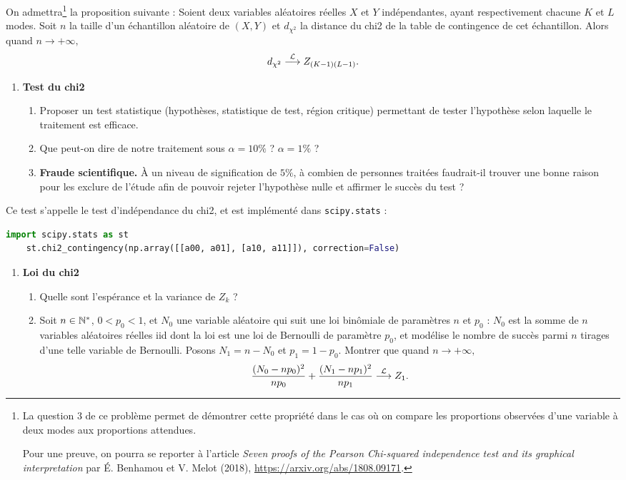 \documentclass[french,11pt]{article}
\begin{document}
On admettra\footnote{La question 3 de ce problème permet de démontrer
cette propriété dans le cas où on compare les proportions observées d'une
variable à deux modes aux proportions attendues.

Pour une preuve, on pourra se reporter à l'article \textit{Seven proofs of the
  Pearson Chi-squared independence test and its graphical interpretation} par
É. Benhamou et V. Melot (2018),
\href{https://arxiv.org/abs/1808.09171}{https://arxiv.org/abs/1808.09171}.  }
la proposition suivante : Soient deux variables aléatoires réelles $X$ et $Y$
indépendantes, ayant respectivement chacune $K$ et $L$ modes. Soit $n$ la
taille d'un échantillon aléatoire de $(X, Y)$ et $d_{\chi^2}$ la distance du
chi2 de la table de contingence de cet échantillon. Alors quand
$n \rightarrow +\infty,$
\[
  d_{\chi^2} \stackrel{\mathcal{L}}{\longrightarrow} Z_{(K-1)(L-1)}.
\]


\begin{enumerate}[resume]
\item \textbf{Test du chi2}
  \begin{enumerate}
  \item Proposer un test statistique (hypothèses, statistique de test, région
    critique) permettant de tester l'hypothèse selon laquelle le traitement est
    efficace.
  \item Que peut-on dire de notre traitement sous $\alpha = 10\%$ ? $\alpha = 1\%$ ?
  \item \textbf{Fraude scientifique.} À un niveau de
    signification de $5\%$, à combien de personnes traitées faudrait-il trouver
    une bonne raison pour les exclure de l'étude afin de pouvoir rejeter l'hypothèse
    nulle et affirmer le succès du test ?
  \end{enumerate}
\end{enumerate}

Ce test s'appelle le test d'indépendance du chi2, et est implémenté dans \texttt{scipy.stats} :

  \begin{lstlisting}[language=Python]
    import scipy.stats as st
    st.chi2_contingency(np.array([[a00, a01], [a10, a11]]), correction=False)
  \end{lstlisting}
  
\begin{enumerate}[resume]
\item \textbf{Loi du chi2} \\
  \begin{enumerate}
  \item Quelle sont l'espérance et la variance de $Z_k$ ? 
  \item Soit $n \in \mathbb{N}^*$, $0 < p_0 < 1$, et $N_0$ une variable aléatoire qui
    suit une loi binômiale de paramètres $n$ et $p_0$ : $N_0$ est la somme de $n$
    variables aléatoires réelles iid dont la loi est une loi de Bernoulli de
    paramètre $p_0$, et modélise le nombre de succès parmi $n$ tirages d'une
    telle variable de Bernoulli. Posons $N_1 = n - N_0$ et $p_1 = 1 -
    p_0$. Montrer que quand $n \rightarrow +\infty,$ 
    \[
      \frac{(N_0 - n p_0)^2}{n p_0}  + \frac{(N_1 - n p_1)^2}{n p_1} \stackrel{\mathcal{L}}{\longrightarrow} Z_1.
    \]
  \end{enumerate}
\end{enumerate}
\end{document}

